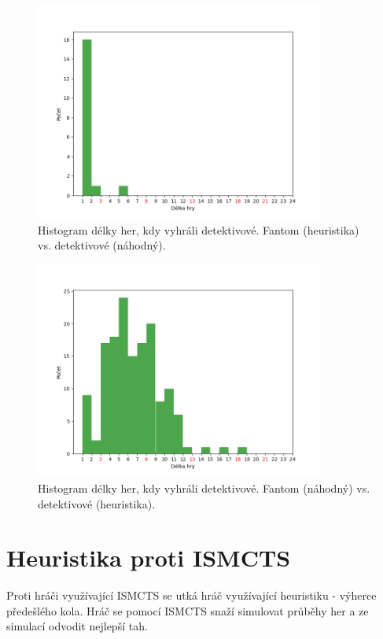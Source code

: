 \begin{figure}[h]
  \centering
  \includegraphics[width=0.85\textwidth]{heur-rand-histogram.png}
  \caption{Histogram délky her, kdy vyhráli detektivové. Fantom (heuristika) vs. detektivové (náhodný).}
  \label{fig:hist-heur-rand}
\end{figure}

\begin{figure}[h]
  \centering
  \includegraphics[width=0.85\textwidth]{rand-heur-histogram.png}
  \caption{Histogram délky her, kdy vyhráli detektivové. Fantom (náhodný) vs. detektivové (heuristika).}
  \label{fig:hist-rand-heur}
\end{figure}

\clearpage


\section{Heuristika proti ISMCTS}
Proti hráči využívající ISMCTS se utká hráč využívající heuristiku - výherce předešlého kola. Hráč se pomocí ISMCTS snaží simulovat průběhy her a ze simulací odvodit nejlepší tah.   

